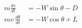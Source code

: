 \begin{align}
m \frac{dv}{dt} & = - W \sin\theta - D \\
m v \, \frac{d\theta}{dt} & = - W \cos\theta + L
\end{align}
